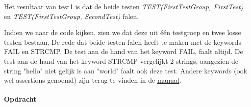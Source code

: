 Het resultaat van test1 is dat de beide testen   \textit{TEST(FirstTestGroup, FirstTest) } en \textit{TEST(FirstTestGroup, SecondTest) }
falen.

Indien we naar de code kijken, zien we dat deze uit één testgroep en twee  losse testen bestaan.
De rede dat beide testen falen heeft te maken met de keywords FAIL en STRCMP. 
De test aan de hand van het keyword FAIL, faalt altijd. De test aan de hand van het keyword STRCMP vergelijkt 2 strings,
aangezien de string "hello" niet gelijk is aan "world" faalt ook deze test. Andere keywords (ook wel assertions genoemd)
zijn terug te vinden in de \href{https://cpputest.github.io/manual.html} {manual}.

\paragraph{Opdracht}

